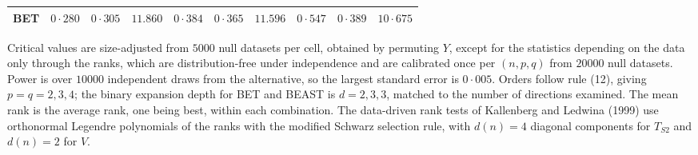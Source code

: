 \begin{table}
{\begin{tabular}{l rrr rrr rrr}
BET & $0{\cdot}280$ & $0{\cdot}305$ & $11.860$ & $0{\cdot}384$ & $0{\cdot}365$ & $11.596$ & $0{\cdot}547$ & $0{\cdot}389$ & $10{\cdot}675$ \\
\hline
\end{tabular}}
\begin{tabnote}
Critical values are size-adjusted from $5000$ null datasets per cell, obtained by permuting $Y$, except for the statistics depending on the data only through the ranks, which are distribution-free under independence and are calibrated once per $(n,p,q)$ from $20000$ null datasets. Power is over $10000$ independent draws from the alternative, so the largest standard error is $0{\cdot}005$. Orders follow rule (12), giving $p=q=2, 3, 4$; the binary expansion depth for BET and BEAST is $d=2, 3, 3$, matched to the number of directions examined. The mean rank is the average rank, one being best, within each combination.
The data-driven rank tests of Kallenberg and Ledwina (1999) use orthonormal Legendre polynomials of the ranks with the modified Schwarz selection rule, with $d(n)=4$ diagonal components for $T_{S2}$ and $d(n)=2$ for $V$.
\end{tabnote}
\label{tab:power_summary}
\end{table}
